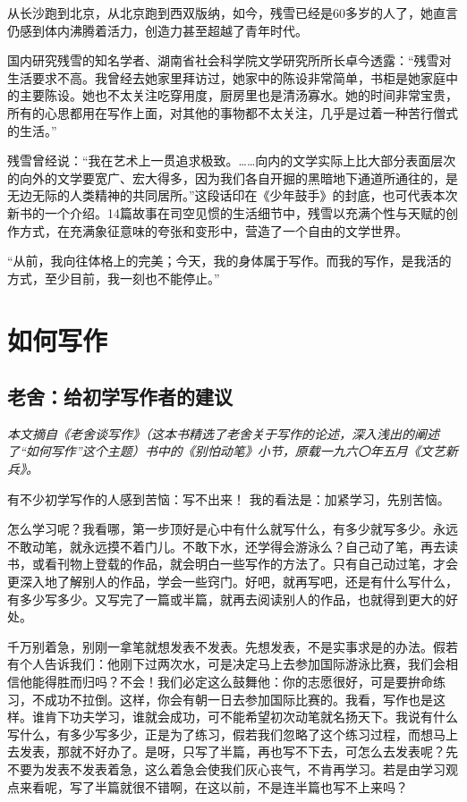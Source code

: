 \documentclass[fontset=fandol,12pt,a5paper]{ctexbook}
\begin{document}
从长沙跑到北京，从北京跑到西双版纳，如今，残雪已经是60多岁的人了，她直言仍感到体内沸腾着活力，创造力甚至超越了青年时代。

国内研究残雪的知名学者、湖南省社会科学院文学研究所所长卓今透露：“残雪对生活要求不高。我曾经去她家里拜访过，她家中的陈设非常简单，书柜是她家庭中的主要陈设。她也不太关注吃穿用度，厨房里也是清汤寡水。她的时间非常宝贵，所有的心思都用在写作上面，对其他的事物都不太关注，几乎是过着一种苦行僧式的生活。”

残雪曾经说：“我在艺术上一贯追求极致。……向内的文学实际上比大部分表面层次的向外的文学要宽广、宏大得多，因为我们各自开掘的黑暗地下通道所通往的，是无边无际的人类精神的共同居所。”这段话印在《少年鼓手》的封底，也可代表本次新书的一个介绍。14篇故事在司空见惯的生活细节中，残雪以充满个性与天赋的创作方式，在充满象征意味的夸张和变形中，营造了一个自由的文学世界。

“从前，我向往体格上的完美；今天，我的身体属于写作。而我的写作，是我活的方式，至少目前，我一刻也不能停止。”


\newpage

\chapter{如何写作}

\section{老舍：给初学写作者的建议}

\emph{本文摘自《老舍谈写作》（这本书精选了老舍关于写作的论述，深入浅出的阐述了“如何写作”这个主题）书中的《别怕动笔》小节，原载一九六〇年五月《文艺新兵》。}
\vspace{2em}

有不少初学写作的人感到苦恼：写不出来！
我的看法是：加紧学习，先别苦恼。

怎么学习呢？我看哪，第一步顶好是心中有什么就写什么，有多少就写多少。永远不敢动笔，就永远摸不着门儿。不敢下水，还学得会游泳么？自己动了笔，再去读书，或看刊物上登载的作品，就会明白一些写作的方法了。只有自己动过笔，才会更深入地了解别人的作品，学会一些窍门。好吧，就再写吧，还是有什么写什么，有多少写多少。又写完了一篇或半篇，就再去阅读别人的作品，也就得到更大的好处。

千万别着急，别刚一拿笔就想发表不发表。先想发表，不是实事求是的办法。假若有个人告诉我们：他刚下过两次水，可是决定马上去参加国际游泳比赛，我们会相信他能得胜而归吗？不会！我们必定这么鼓舞他：你的志愿很好，可是要拚命练习，不成功不拉倒。这样，你会有朝一日去参加国际比赛的。我看，写作也是这样。谁肯下功夫学习，谁就会成功，可不能希望初次动笔就名扬天下。我说有什么写什么，有多少写多少，正是为了练习，假若我们忽略了这个练习过程，而想马上去发表，那就不好办了。是呀，只写了半篇，再也写不下去，可怎么去发表呢？先不要为发表不发表着急，这么着急会使我们灰心丧气，不肯再学习。若是由学习观点来看呢，写了半篇就很不错啊，在这以前，不是连半篇也写不上来吗？
\end{document}
